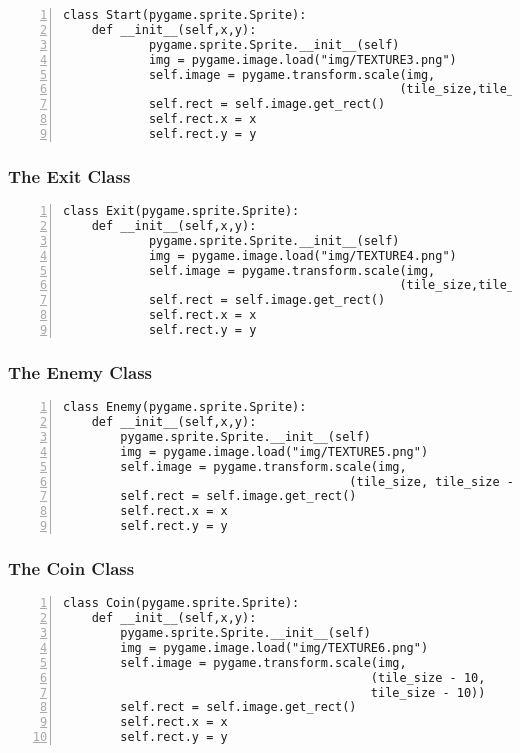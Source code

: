 \documentclass[12pt]{report}
\begin{document}
\begin{Verbatim}[numbers=left, frame=single]
class Start(pygame.sprite.Sprite):
    def __init__(self,x,y):
            pygame.sprite.Sprite.__init__(self)
            img = pygame.image.load("img/TEXTURE3.png")
            self.image = pygame.transform.scale(img, 
                                               (tile_size,tile_size))
            self.rect = self.image.get_rect()
            self.rect.x = x
            self.rect.y = y
\end{Verbatim}

\subsubsection{The Exit Class}


\begin{Verbatim}[numbers=left, frame=single]
class Exit(pygame.sprite.Sprite):
    def __init__(self,x,y):
            pygame.sprite.Sprite.__init__(self)
            img = pygame.image.load("img/TEXTURE4.png")
            self.image = pygame.transform.scale(img,
                                               (tile_size,tile_size))
            self.rect = self.image.get_rect()
            self.rect.x = x
            self.rect.y = y
\end{Verbatim}

\subsubsection{The Enemy Class}


\begin{Verbatim}[numbers=left, frame=single]
class Enemy(pygame.sprite.Sprite):
    def __init__(self,x,y):
        pygame.sprite.Sprite.__init__(self)
        img = pygame.image.load("img/TEXTURE5.png")
        self.image = pygame.transform.scale(img,
                                        (tile_size, tile_size - 10))
        self.rect = self.image.get_rect()
        self.rect.x = x
        self.rect.y = y
\end{Verbatim}

\subsubsection{The Coin Class}


\begin{Verbatim}[numbers=left, frame=single]
class Coin(pygame.sprite.Sprite):
    def __init__(self,x,y):
        pygame.sprite.Sprite.__init__(self)
        img = pygame.image.load("img/TEXTURE6.png")
        self.image = pygame.transform.scale(img, 
                                           (tile_size - 10,
                                           tile_size - 10))
        self.rect = self.image.get_rect()
        self.rect.x = x
        self.rect.y = y
\end{Verbatim}
\end{document}
